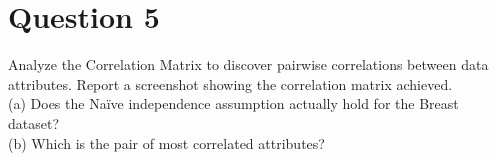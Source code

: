 \section{Question 5}

\begin{question}
    Analyze the Correlation Matrix to discover pairwise correlations between data attributes. Report a
screenshot showing the correlation matrix achieved.
    \\
    (a) Does the Naïve independence assumption
actually hold for the Breast dataset?
    \\
    (b) Which is the pair of most correlated attributes?
\end{question}

\begin{answer}
\end{answer}
